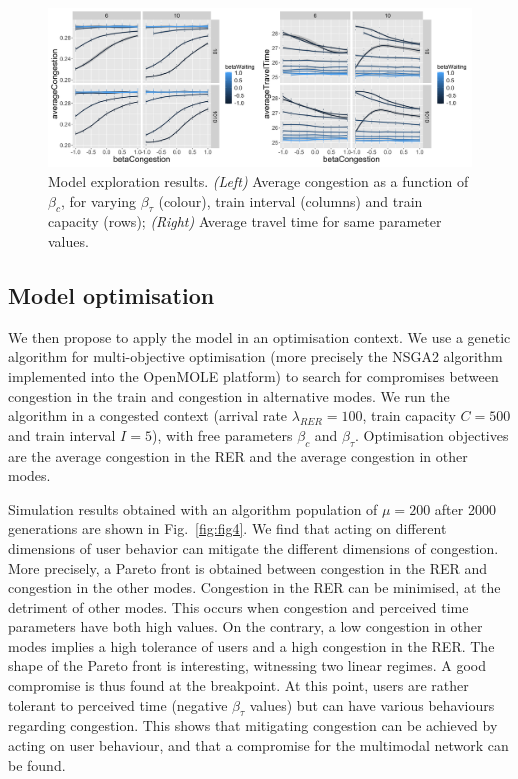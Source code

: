 \documentclass[10pt]{article}
\begin{document}
\begin{figure}%
\centerline{\includegraphics[width=\linewidth]{Fig3.png}}
\caption{Model exploration results. \textit{(Left)} Average congestion as a function of $\beta_c$, for varying $\beta_{\tau}$ (colour), train interval (columns) and train capacity (rows); \textit{(Right)} Average travel time for same parameter values.\label{fig:fig3}}
\end{figure}

\subsection{Model optimisation}


We then propose to apply the model in an optimisation context. We use a genetic algorithm for multi-objective optimisation (more precisely the NSGA2 algorithm implemented into the OpenMOLE platform) to search for compromises between congestion in the train and congestion in alternative modes. We run the algorithm in a congested context (arrival rate $\lambda_{RER} = 100$, train capacity $C=500$ and train interval $I=5$), with free parameters $\beta_c$ and $\beta_{\tau}$. Optimisation objectives are the average congestion in the RER and the average congestion in other modes.

Simulation results obtained with an algorithm population of $\mu = 200$ after 2000 generations are shown in Fig.~\ref{fig:fig4}. We find that acting on different dimensions of user behavior can mitigate the different dimensions of congestion. More precisely, a Pareto front is obtained between congestion in the RER and congestion in the other modes. Congestion in the RER can be minimised, at the detriment of other modes. This occurs when congestion and perceived time parameters have both high values. On the contrary, a low congestion in other modes implies a high tolerance of users and a high congestion in the RER. The shape of the Pareto front is interesting, witnessing two linear regimes. A good compromise is thus found at the breakpoint. At this point, users are rather tolerant to perceived time (negative $\beta_{\tau}$ values) but can have various behaviours regarding congestion. This shows that mitigating congestion can be achieved by acting on user behaviour, and that a compromise for the multimodal network can be found.
\end{document}
